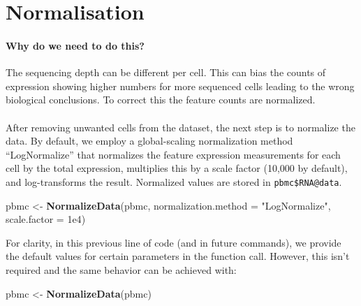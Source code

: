 \documentclass[
]{book}
\newenvironment{Shaded}{\begin{snugshade}}{\end{snugshade}}
\newcommand{\AttributeTok}[1]{\textcolor[rgb]{0.13,0.29,0.53}{#1}}
\newcommand{\FloatTok}[1]{\textcolor[rgb]{0.00,0.00,0.81}{#1}}
\newcommand{\FunctionTok}[1]{\textcolor[rgb]{0.13,0.29,0.53}{\textbf{#1}}}
\newcommand{\NormalTok}[1]{#1}
\newcommand{\OtherTok}[1]{\textcolor[rgb]{0.56,0.35,0.01}{#1}}
\newcommand{\StringTok}[1]{\textcolor[rgb]{0.31,0.60,0.02}{#1}}
\begin{document}
\hypertarget{norm}{%
\chapter{Normalisation}\label{norm}}

\hypertarget{why-do-we-need-to-do-this-1}{%
\subsubsection*{Why do we need to do this?}\label{why-do-we-need-to-do-this-1}}

The sequencing depth can be different per cell. This can bias the counts of expression showing higher numbers for more sequenced cells leading to the wrong biological conclusions. To correct this the feature counts are normalized.

\hypertarget{section-3}{%
\subsubsection*{}\label{section-3}}

After removing unwanted cells from the dataset, the next step is to normalize the data. By default, we employ a global-scaling normalization method ``LogNormalize'' that normalizes the feature expression measurements for each cell by the total expression, multiplies this by a scale factor (10,000 by default), and log-transforms the result. Normalized values are stored in \texttt{pbmc\$RNA@data}.

\begin{Shaded}
\begin{Highlighting}[]
\NormalTok{pbmc }\OtherTok{\textless{}{-}} \FunctionTok{NormalizeData}\NormalTok{(pbmc, }\AttributeTok{normalization.method =} \StringTok{"LogNormalize"}\NormalTok{, }\AttributeTok{scale.factor =} \FloatTok{1e4}\NormalTok{)}
\end{Highlighting}
\end{Shaded}

For clarity, in this previous line of code (and in future commands), we provide the default values for certain parameters in the function call. However, this isn't required and the same behavior can be achieved with:

\begin{Shaded}
\begin{Highlighting}[]
\NormalTok{pbmc }\OtherTok{\textless{}{-}} \FunctionTok{NormalizeData}\NormalTok{(pbmc)}
\end{Highlighting}
\end{Shaded}
\end{document}
